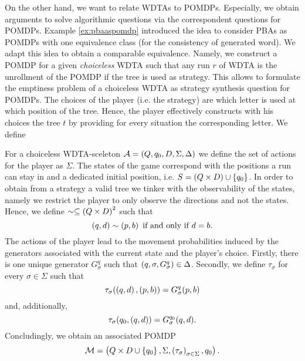 On the other hand, we want to relate \acp{WDTA} to \acp{POMDP}. Especially, we 
obtain arguments to solve algorithmic questions via the correspondent questions
for \acp{POMDP}. Example \ref{ex:pbaaspomdp} introduced the idea to consider 
\acp{PBA} as \acp{POMDP} with one equivalence class (for the consistency of
generated word). We adapt this idea to obtain a comparable equivalence. Namely,
we construct a \ac{POMDP} for a given \emph{choiceless} \ac{WDTA} such that any 
run $r$ of \ac{WDTA} is the unrollment of the \ac{POMDP} if the tree is used as 
strategy. This allows to formulate the emptiness problem of a choiceless 
\ac{WDTA} as strategy synthesis question for \acp{POMDP}. The choices of the 
player (i.e.  the strategy) are which letter is used at which position of 
the tree. Hence, the player effectively constructs with his choices the tree 
$t$ by providing for every situation the corresponding letter. We define
\begin{definition}
  For a choiceless \ac{WDTA}-sceleton
  $\mathcal{A} = \left(Q, q_{0}, D, \Sigma, \Delta\right)$ we define the set of 
  actions for the player as $\Sigma$. The states of the game correspond with 
  the positions a run can stay in and a dedicated initial position, i.e. 
  $S = \left(Q\times D\right)\cup\left\{q_{0}\right\}$. In order to obtain from a strategy a 
  valid tree we tinker with the observability of the states, namely we restrict 
  the player to only observe the directions and not the states. Hence, we 
  define $\sim\subseteq\left(Q\times D\right)^{2}$ such that
  \begin{equation*}
    \left(q, d\right)\sim\left(p, b\right)\text{ if and only if }d = b.
  \end{equation*}
  The actions of the player lead to the movement probabilities induced by the
  generators associated with the current state and the player's choice. 
  Firstly, there is one unique generator $G_{\sigma}^{q}$ such that 
  $\left(q,\sigma,G_{\sigma}^{q}\right)\in\Delta$. Secondly, we define 
  $\tau_{\sigma}$ for every $\sigma\in\Sigma$ such that
  \begin{equation*}
    \tau_{\sigma}(\left(q,d\right),\left(p,b\right)) = G_{\sigma}^{q}(p,b)
  \end{equation*}
  and, additionally,
  \begin{equation*}
    \tau_{\sigma}(q_{0},\left(q,d\right)) = G_{\sigma}^{q_{0}}(q,d).
  \end{equation*}
  Concludingly, we obtain an associated \ac{POMDP}
  \begin{equation*}
    \mathcal{M} = \left(
      Q\times D\cup \left\{q_{0}\right\}, \Sigma, 
        \left(\tau_{\sigma}\right)_{\sigma\in\Sigma}, q_{0}
    \right).
  \end{equation*}
\end{definition}

